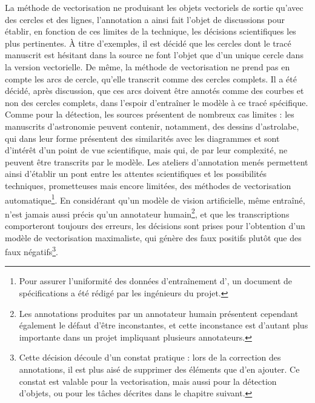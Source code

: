 	La méthode de vectorisation ne produisant les objets vectoriels de sortie qu'avec des cercles et des lignes, l'annotation a ainsi fait l'objet de discussions pour établir, en fonction de ces limites de la technique, les décisions scientifiques les plus pertinentes. À titre d'exemples, il est décidé que les cercles dont le tracé manuscrit est hésitant dans la source ne font l'objet que d'un unique cercle dans la version vectorielle. De même, la méthode de vectorisation ne prend pas en compte les arcs de cercle, qu'elle transcrit comme des cercles complets. Il a été décidé, après discussion, que ces arcs doivent être annotés comme des courbes et non des cercles complets, dans l'espoir d'entraîner le modèle à ce tracé spécifique. Comme pour la détection, les sources présentent de nombreux cas limites : les manuscrits d'astronomie peuvent contenir, notamment, des dessins d'astrolabe, qui dans leur forme présentent des similarités avec les diagrammes et sont d'intérêt d'un point de vue scientifique, mais qui, de par leur complexité, ne peuvent être transcrits par le modèle. Les ateliers d'annotation menés permettent ainsi d'établir un pont entre les attentes scientifiques et les possibilités techniques, prometteuses mais encore limitées, des méthodes de vectorisation automatique\footnote{Pour assurer l'uniformité des données d'entraînement d'\eida, un document de spécifications a été rédigé par les ingénieurs du projet.}. En considérant qu'un modèle de vision artificielle, même entraîné, n'est jamais aussi précis qu'un annotateur humain\footnote{Les annotations produites par un annotateur humain présentent cependant également le défaut d'être inconstantes, et cette inconstance est d'autant plus importante dans un projet impliquant plusieurs annotateurs.}, et que les transcriptions comporteront toujours des erreurs, les décisions sont prises pour l'obtention d'un modèle de vectorisation maximaliste, qui génère des faux positifs plutôt que des faux négatifs\footnote{Cette décision découle d'un constat pratique : lors de la correction des annotations, il est plus aisé de supprimer des éléments que d'en ajouter. Ce constat est valable pour la vectorisation, mais aussi pour la détection d'objets, ou pour les tâches décrites dans le chapitre suivant.}.

